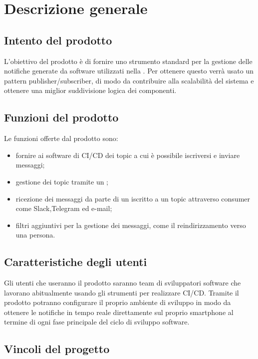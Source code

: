 \section{Descrizione generale}

	\subsection{Intento del prodotto}
    
    L'obiettivo del prodotto è di fornire uno strumento standard per la gestione delle notifiche generate da software utilizzati nella .
    Per ottenere questo verrà usato un pattern publisher/subscriber, di modo da contribuire alla scalabilità del sistema e ottenere una miglior suddivisione logica dei componenti.
	
	\subsection{Funzioni del prodotto}
	
    Le funzioni offerte dal prodotto sono:
    \begin{itemize}
		\item fornire ai software di CI/CD dei topic a cui è possibile iscriversi e inviare messaggi;
		\item gestione dei topic tramite un ;
        \item ricezione dei messaggi da parte di un  iscritto a un topic attraverso consumer come Slack,Telegram ed e-mail;
        \item filtri aggiuntivi per la gestione dei messaggi, come il reindirizzamento verso una persona.
	\end{itemize}

	\subsection{Caratteristiche degli utenti}
    
    Gli utenti che useranno il prodotto saranno team di sviluppatori software che lavorano abitualmente usando gli strumenti per realizzare CI/CD.
    Tramite il prodotto potranno configurare il proprio ambiente di sviluppo in modo da ottenere le notifiche in tempo reale direttamente sul proprio smartphone al termine di ogni fase principale del ciclo di sviluppo software.
	
	\subsection{Vincoli del progetto}
	
